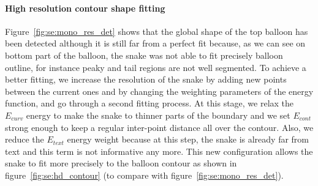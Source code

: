 

\paragraph{High resolution contour shape fitting}
Figure~\ref{fig:se:mono_res_det} shows that the global shape of the top balloon has been detected although it is still far from a perfect fit because, as we can see on bottom part of the balloon, the snake was not able to fit precisely balloon outline, for instance peaky and tail regions are not well segmented.
To achieve a better fitting, we increase the resolution of the snake by adding new points between the current ones and by changing the weighting parameters of the energy function, and go through a second fitting process.
At this stage, we relax the $E_{curv}$ energy to make the snake to thinner parts of the boundary and we set $E_{cont}$ strong enough to keep a regular inter-point distance all over the contour.
Also, we reduce the $E_{text}$ energy weight because at this step, the snake is already far from text and this term is not informative any more.
This new configuration allows the snake to fit more precisely to the balloon contour as shown in figure~\ref{fig:se:hd_contour} (to compare with figure~\ref{fig:se:mono_res_det}).

